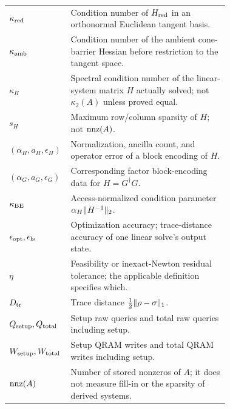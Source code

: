 \begin{table}[!htbp]
\begin{tabular}{@{}lp{0.72\linewidth}@{}}
  $\kappa_{\rm red}$ & Condition number of $H_{\rm red}$ in an orthonormal Euclidean tangent basis. \\
  $\kappa_{\rm amb}$ & Condition number of the ambient cone-barrier Hessian before restriction to the tangent space. \\
  $\kappa_H$ & Spectral condition number of the linear-system matrix $H$ actually solved; not $\kappa_2(A)$ unless proved equal. \\
  $s_H$ & Maximum row/column sparsity of $H$; not $\operatorname{nnz}(A)$. \\
  $(\alpha_H,a_H,\epsilon_H)$ & Normalization, ancilla count, and operator error of a block encoding of $H$. \\
  $(\alpha_G,a_G,\epsilon_G)$ & Corresponding factor block-encoding data for $H=G^\dagger G$. \\
  $\kappa_{\rm BE}$ & Access-normalized condition parameter $\alpha_H\lVert H^{-1}\rVert_2$. \\
  $\epsilon_{\rm opt},\epsilon_{\rm ls}$ & Optimization accuracy; trace-distance accuracy of one linear solve's output state. \\
  $\eta$ & Feasibility or inexact-Newton residual tolerance; the applicable definition specifies which. \\
  $D_{\mathrm{tr}}$ & Trace distance $\tfrac12\lVert\rho-\sigma\rVert_1$. \\
  $Q_{\rm setup},Q_{\rm total}$ & Setup raw queries and total raw queries including setup. \\
  $W_{\rm setup},W_{\rm total}$ & Setup QRAM writes and total QRAM writes including setup. \\
  $\operatorname{nnz}(A)$ & Number of stored nonzeros of $A$; it does not measure fill-in or the sparsity of derived systems. \\
  \bottomrule
 \end{tabular}
\end{table}
